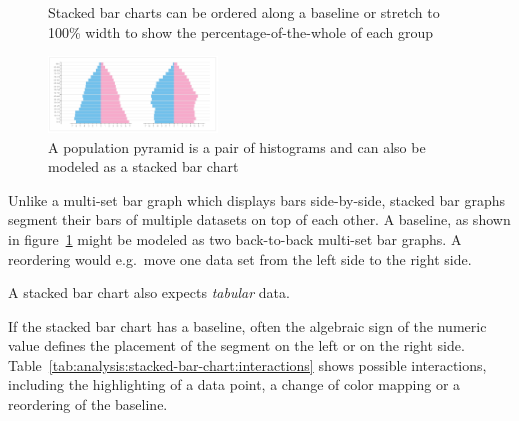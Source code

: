 \begin{figure}
  \centering
  \caption{Stacked bar charts can be ordered along a baseline or stretch to 100\% width to show the percentage-of-the-whole of each group}%
  \label{fig:analysis:stacked-bar-chart}
  \qquad
\end{figure}

\begin{figure}
  \centering
  \caption{A population pyramid is a pair of histograms and can also be modeled as a stacked bar chart}%
  \label{fig:analysis:population-pyramid}
  \includegraphics[width=0.4\textwidth]{figures/analysis/population-pyramid.png}%
\end{figure}

Unlike a multi-set bar graph which displays bars side-by-side, stacked bar graphs segment their bars of multiple datasets on top of each other.
A baseline, as shown in figure~\ref{fig:analysis:stacked-bar-chart} might be modeled as two back-to-back multi-set bar graphs. A reordering would e.g.\ move one data set from the left side to the right side.

A stacked bar chart also expects \emph{tabular} data.

If the stacked bar chart has a baseline, often the algebraic sign of the numeric value defines the placement of the segment on the left or on the right side.
Table~\ref{tab:analysis:stacked-bar-chart:interactions} shows possible interactions, including the highlighting of a data point, a change of color mapping or a reordering of the baseline.

